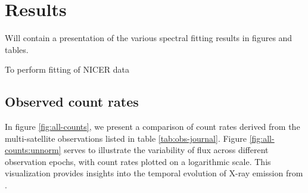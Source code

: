 \section{Results}
    Will contain a presentation of the various spectral fitting results in figures and tables.

    To perform fitting of NICER data \cite{orio2022nicer}

    \subsection{Observed count rates}
    In figure \ref{fig:all-counts}, we present a comparison of count rates derived from the multi-satellite observations listed in table \ref{tab:obs-journal}. Figure \ref{fig:all-counts:unnorm} serves to illustrate the variability of flux across different observation epochs, with count rates plotted on a logarithmic scale. This visualization provides insights into the temporal evolution of X-ray emission from \source.

